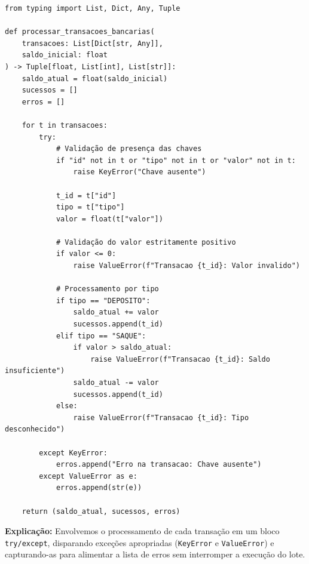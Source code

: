 \ifmostrarGabarito
\begin{verbatim}
from typing import List, Dict, Any, Tuple

def processar_transacoes_bancarias(
    transacoes: List[Dict[str, Any]],
    saldo_inicial: float
) -> Tuple[float, List[int], List[str]]:
    saldo_atual = float(saldo_inicial)
    sucessos = []
    erros = []
    
    for t in transacoes:
        try:
            # Validação de presença das chaves
            if "id" not in t or "tipo" not in t or "valor" not in t:
                raise KeyError("Chave ausente")
                
            t_id = t["id"]
            tipo = t["tipo"]
            valor = float(t["valor"])
            
            # Validação do valor estritamente positivo
            if valor <= 0:
                raise ValueError(f"Transacao {t_id}: Valor invalido")
                
            # Processamento por tipo
            if tipo == "DEPOSITO":
                saldo_atual += valor
                sucessos.append(t_id)
            elif tipo == "SAQUE":
                if valor > saldo_atual:
                    raise ValueError(f"Transacao {t_id}: Saldo insuficiente")
                saldo_atual -= valor
                sucessos.append(t_id)
            else:
                raise ValueError(f"Transacao {t_id}: Tipo desconhecido")
                
        except KeyError:
            erros.append("Erro na transacao: Chave ausente")
        except ValueError as e:
            erros.append(str(e))
            
    return (saldo_atual, sucessos, erros)
\end{verbatim}

\textbf{Explicação:}
Envolvemos o processamento de cada transação em um bloco \texttt{try/except}, disparando exceções apropriadas (\texttt{KeyError} e \texttt{ValueError}) e capturando-as para alimentar a lista de erros sem interromper a execução do lote.
\else
{}
\clearpage
{}
\clearpage
\fi
